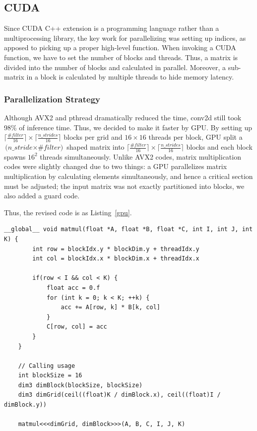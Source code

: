 \documentclass[a4paper,12pt]{article}
\begin{document}
\subsection{CUDA}
Since CUDA C++ extension is a programming language rather than a multiprocessing library, the key work for parallelizing was setting up indices, as apposed to picking up a proper high-level function. When invoking a CUDA function, we have to set the number of blocks and threads. Thus, a matrix is divided into the number of blocks and calculated in parallel. Moreover, a sub-matrix in a block is calculated by multiple threads to hide memory latency.

\subsubsection{Parallelization Strategy}

Although AVX2 and pthread dramatically reduced the time, conv2d still took 98\% of inference time. Thus, we decided to make it faster by GPU\@. By setting up $\lceil \frac{\textit{\#filter}}{16} \rceil \times \lceil \frac{\textit{n\_strides}}{16} \rceil $ blocks per grid and $16 \times 16$ threads per block, GPU split a $\textit{(n\_stride} \times \textit{\#filter)}$ shaped matrix into $\lceil \frac{\textit{\#filter}}{16} \rceil \times \lceil \frac{\textit{n\_strides}}{16} \rceil $ blocks and each block spawns $16^2$ threads simultaneously. Unlike AVX2 codes, matrix multiplication codes were slightly changed due to two things: a GPU parallelizes matrix multiplication by calculating elements simultaneously, and hence a critical section must be adjusted; the input matrix was not exactly partitioned into blocks, we also added a guard code.

Thus, the revised code is as Listing~\ref{gpu}\@.
\begin{lstlisting}[gobble=4, label={gpu}, captionpos=b, caption={A GPU-acclerated matrix multiplication pseudo-code. For simplicity, some subordinate codes (cudaMalloc, cudaMemcpy, cudaFree) were not represented in this example.}]
	__global__ void matmul(float *A, float *B, float *C, int I, int J, int K) {
		int row = blockIdx.y * blockDim.y + threadIdx.y
		int col = blockIdx.x * blockDim.x + threadIdx.x

		if(row < I && col < K) {
			float acc = 0.f
			for (int k = 0; k < K; ++k) {
				acc += A[row, k] * B[k, col]
			}
			C[row, col] = acc
		}
	}

	// Calling usage
	int blockSize = 16
	dim3 dimBlock(blockSize, blockSize)
	dim3 dimGrid(ceil((float)K / dimBlock.x), ceil((float)I / dimBlock.y))

	matmul<<<dimGrid, dimBlock>>>(A, B, C, I, J, K)
\end{lstlisting}
\end{document}
